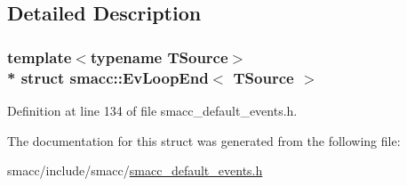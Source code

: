 \subsection{Detailed Description}
\subsubsection*{template$<$typename T\+Source$>$\\*
struct smacc\+::\+Ev\+Loop\+End$<$ T\+Source $>$}



Definition at line 134 of file smacc\+\_\+default\+\_\+events.\+h.



The documentation for this struct was generated from the following file\+:\begin{DoxyCompactItemize}
\item 
smacc/include/smacc/\hyperlink{smacc__default__events_8h}{smacc\+\_\+default\+\_\+events.\+h}\end{DoxyCompactItemize}
